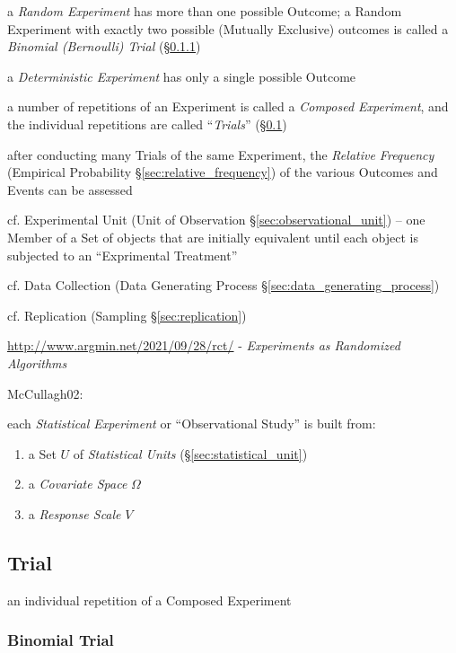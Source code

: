 a \emph{Random Experiment} has more than one possible Outcome; a Random
Experiment with exactly two possible (Mutually Exclusive) outcomes is called a
\emph{Binomial (Bernoulli) Trial} (\S\ref{sec:binomial_trial})

a \emph{Deterministic Experiment} has only a single possible Outcome

a number of repetitions of an Experiment is called a \emph{Composed Experiment},
and the individual repetitions are called ``\emph{Trials}'' (\S\ref{sec:trial})

after conducting many Trials of the same Experiment, the \emph{Relative
  Frequency} (Empirical Probability \S\ref{sec:relative_frequency}) of the
various Outcomes and Events can be assessed

\fist cf. Experimental Unit (Unit of Observation \S\ref{sec:observational_unit})
-- one Member of a Set of objects that are initially equivalent until each
object is subjected to an ``Exprimental Treatment''

\fist cf. Data Collection (Data Generating Process
\S\ref{sec:data_generating_process})

\fist cf. Replication (Sampling \S\ref{sec:replication})

\url{http://www.argmin.net/2021/09/28/rct/} - \emph{Experiments as Randomized
Algorithms}

\asterism


McCullagh02:

each \emph{Statistical Experiment} or ``Observational Study'' is built from:
\begin{enumerate}
  \item a Set $U$ of \emph{Statistical Units} (\S\ref{sec:statistical_unit})
  \item a \emph{Covariate Space} $\Omega$
  \item a \emph{Response Scale} $V$
\end{enumerate}



\subsection{Trial}\label{sec:trial}

an individual repetition of a Composed Experiment



\subsubsection{Binomial Trial}\label{sec:binomial_trial}

